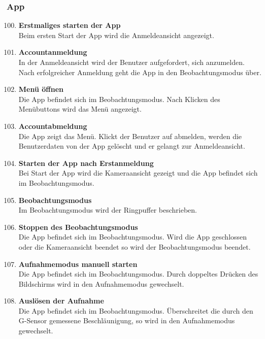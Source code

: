 \subsubsection{\gls{App}}
\begin{enumerate}[\bfseries{TK}10]  
\setcounter{enumi}{99}{}

\item \textbf{Erstmaliges starten der \gls{App}} \hfill\\  
Beim ersten Start der App wird die Anmeldeansicht angezeigt.

\item \textbf{Accountanmeldung} \hfill\\  
In der Anmeldeansicht wird der Benutzer aufgefordert, sich anzumelden. Nach erfolgreicher Anmeldung geht die \gls{App} in den Beobachtungsmodus \"uber.

\item \textbf{Men\"u \"offnen} \hfill\\
Die \gls{App} befindet sich im Beobachtungsmodus. Nach Klicken des Men\"ubuttons wird das Men\"u angezeigt.

\item \textbf{Accountabmeldung} \hfill\\  
Die App zeigt das Men\"u. Klickt der Benutzer auf abmelden, werden die Benutzerdaten von der App gelöscht und er gelangt zur Anmeldeansicht.

\item \textbf{Starten der \gls{App} nach Erstanmeldung} \hfill\\  
Bei Start der App wird die Kameraansicht gezeigt und die App befindet sich im Beobachtungsmodus.

\item \textbf{Beobachtungsmodus} \hfill\\
Im Beobachtungsmodus wird der \gls{Ringpuffer} beschrieben.

\item \textbf{Stoppen des Beobachtungsmodus} \hfill\\  
Die \gls{App} befindet sich im Beobachtungsmodus. Wird die App geschlossen oder die Kameraansicht beendet so wird der Beobachtungsmodus beendet.

\item \textbf{Aufnahmemodus manuell starten} \hfill\\
Die \gls{App} befindet sich im Beobachtungsmodus. Durch doppeltes Dr\"ucken des Bildschirms wird in den Aufnahmemodus gewechselt. 

\item \textbf{Ausl\"osen der Aufnahme} \hfill\\  
Die \gls{App} befindet sich im Beobachtungsmodus. Überschreitet die durch den \gls{G-Sensor} gemessene Beschläunigung, so wird in den Aufnahmemodus gewechselt.


\end{enumerate}
